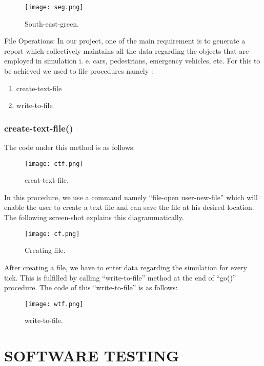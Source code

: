 \documentclass[11pt,a4paper]{article}
\begin{document}
\newpage

\begin{figure}[!ht]
\centering
\texttt{[image: seg.png]}
\caption{\label{fig:seg}South-east-green.}
\end{figure}
                        
File Operations: \newline
In our project, one of the main requirement is to generate a report which collectively maintains all the data regarding the objects that are employed in simulation i. e. cars, pedestrians, emergency vehicles, etc. For this to be achieved we used to file procedures namely :
\begin{enumerate}
\item create-text-file
\item write-to-file
\end{enumerate}

\subsubsection{\textbf{create-text-file()}}
The code under this method is as follows:

\begin{figure}[!ht]
\centering
\texttt{[image: ctf.png]}
\caption{\label{fig:ctf}creat-text-file.}
\end{figure}

In this procedure, we use a command namely “file-open user-new-file” which will enable the user to create a text file and can save the file at his desired location. The following screen-shot explains this diagrammatically.
\newpage
\begin{figure}[!ht]
\centering
\texttt{[image: cf.png]}
\caption{\label{fig:cf}Creating file.}
\end{figure}

After creating a file, we have to enter data regarding the simulation for every tick. This is fulfilled by calling “write-to-file” method at the end of “go()” procedure. The code of this “write-to-file” is as follows:

\begin{figure}[!ht]
\centering
\texttt{[image: wtf.png]}
\caption{\label{fig:wtf}write-to-file.}
\end{figure}

\section{SOFTWARE TESTING}
\end{document}
